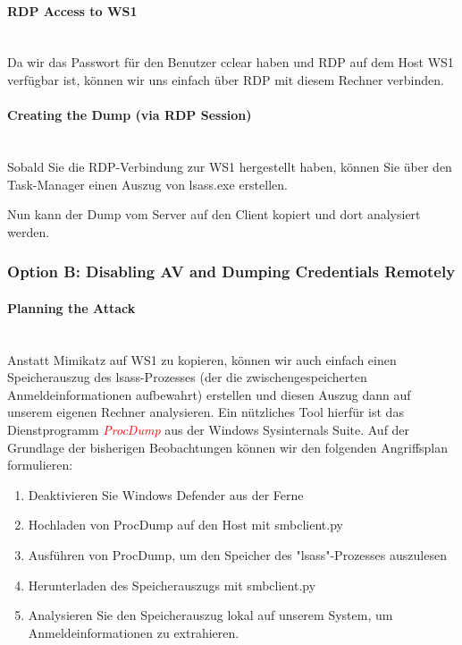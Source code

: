\paragraph{RDP Access to WS1}\mbox{} \\
Da wir das Passwort für den Benutzer cclear haben und RDP auf dem Host WS1 verfügbar ist, können wir uns einfach über RDP mit diesem Rechner verbinden.

\paragraph{Creating the Dump (via RDP Session)}\mbox{} \\
Sobald Sie die RDP-Verbindung zur WS1 hergestellt haben, können Sie über den Task-Manager einen Auszug von lsass.exe erstellen.

Nun kann der Dump vom Server auf den Client kopiert und dort analysiert werden.

\subsubsection{Option B: Disabling AV and Dumping Credentials Remotely}

\paragraph{Planning the Attack}\mbox{} \\
Anstatt Mimikatz auf WS1 zu kopieren, können wir auch einfach einen Speicherauszug des lsass-Prozesses (der die zwischengespeicherten Anmeldeinformationen aufbewahrt) erstellen und diesen Auszug dann auf unserem eigenen Rechner analysieren.
Ein nützliches Tool hierfür ist das Dienstprogramm \textcolor{red}{\textit{ProcDump}} aus der Windows Sysinternals Suite.
Auf der Grundlage der bisherigen Beobachtungen können wir den folgenden Angriffsplan formulieren:\\

\begin{enumerate}
    \item Deaktivieren Sie Windows Defender aus der Ferne
    \item Hochladen von ProcDump auf den Host mit smbclient.py
    \item Ausführen von ProcDump, um den Speicher des "lsass"-Prozesses auszulesen
    \item Herunterladen des Speicherauszugs mit smbclient.py
    \item Analysieren Sie den Speicherauszug lokal auf unserem System, um Anmeldeinformationen zu extrahieren.
\end{enumerate}

